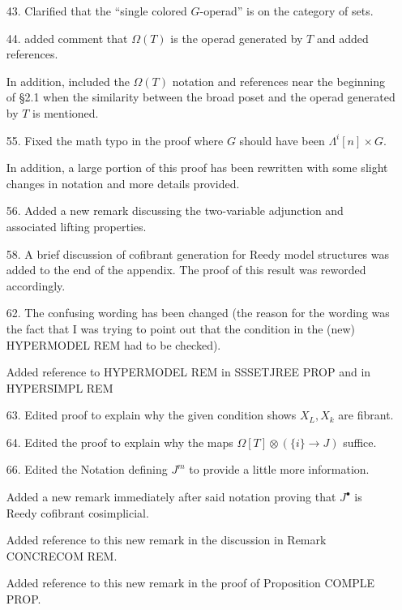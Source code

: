 \documentclass{article}
\begin{document}
\begin{itemize}
\item[43.] Clarified that the ``single colored $G$-operad'' is on the category of sets.

\item[44.] added comment that $\Omega(T)$ is the operad generated by $T$ and added references.

In addition, included the $\Omega(T)$ notation and references near the beginning of \S 2.1 when the similarity between the broad poset and the operad generated by $T$ is mentioned.

\item[55.] Fixed the math typo in the proof where $G$ should have been $\Lambda^i[n] \times G$.

In addition, a large portion of this proof has been rewritten with some slight changes in notation and more details provided.

\item[56.] Added a new remark discussing the two-variable adjunction and associated lifting properties.

\item[58.] A brief discussion of cofibrant generation for Reedy model structures was added to the end of the appendix. The proof of this result was reworded accordingly.

\item[62.] The confusing wording has been changed (the reason for the wording was the fact that I was trying to point out that the condition in the (new) HYPERMODEL REM had to be checked).

Added reference to HYPERMODEL REM in SSSETJREE PROP and in HYPERSIMPL REM

\item[63.] Edited proof to explain why the given condition shows $X_L,X_k $ are fibrant.

\item[64.] Edited the proof to explain why the maps $\Omega[T] \otimes (\{i\} \to J)$ suffice.

\item[66.] Edited the Notation defining $J^m$ to provide a little more information.

Added a new remark immediately after said notation proving that $J^{\bullet}$ is Reedy cofibrant cosimplicial.

Added reference to this new remark in the discussion in Remark CONCRECOM REM.

Added reference to this new remark in the proof of Proposition COMPLE PROP.


\end{itemize}
\end{document}
